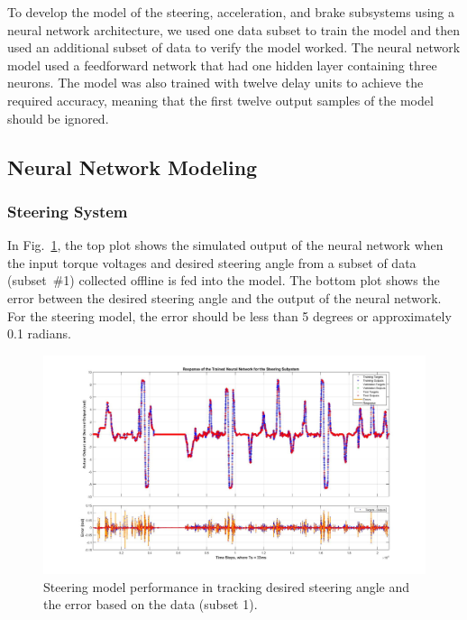 \documentclass[conference]{IEEEtran}
\begin{document}
To develop the model of the steering, acceleration, and brake subsystems using a neural network architecture, we used one data subset to train the model and then used an additional subset of data to verify the model worked. The neural network model used a feedforward network that had one hidden layer containing three neurons. The model was also trained with twelve delay units to achieve the required accuracy, meaning that the first twelve output samples of the model should be ignored.
\subsection{Neural Network Modeling}
\label{sec:NN-Modeling}

\subsubsection{Steering System}
%
In Fig.~\ref{fig:InitialSteeringModel}, the top plot shows the simulated output of the neural network when the input torque voltages and desired steering angle from a subset of data (subset~\#1) collected offline is fed into the model. The bottom plot shows the error between the desired steering angle and the output of the neural network. For the steering model, the error should be less than 5 degrees or approximately 0.1 radians. %
%
\begin{figure}[htbp]
  \centering
  \includegraphics[width=0.90\linewidth]{figs/img/steeringNeuralNetworkTrainedOutput}
  \caption{Steering model performance in tracking desired steering angle and the error based on the data (subset 1).}
  \label{fig:InitialSteeringModel}
\end{figure}
%
\end{document}
